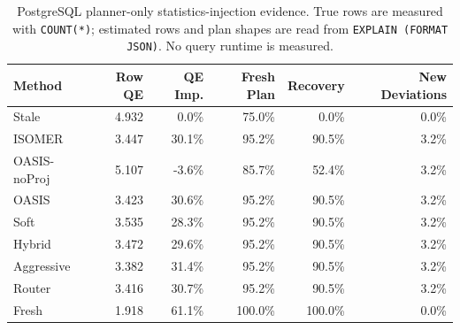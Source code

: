\begin{table}[t]
  \centering
  \small
  \caption{PostgreSQL planner-only statistics-injection evidence. True rows are measured with \texttt{COUNT(*)}; estimated rows and plan shapes are read from \texttt{EXPLAIN (FORMAT JSON)}. No query runtime is measured.}
  \label{tab:postgres_planner_stats_injection}
  \setlength{\tabcolsep}{4pt}
  \begin{tabular}{lrrrrr}
    \toprule
    Method & Row QE & QE Imp. & Fresh Plan & Recovery & New Deviations \\
    \midrule
    Stale & 4.932 & 0.0\% & 75.0\% & 0.0\% & 0.0\% \\
    ISOMER & 3.447 & 30.1\% & 95.2\% & 90.5\% & 3.2\% \\
    OASIS-noProj & 5.107 & -3.6\% & 85.7\% & 52.4\% & 3.2\% \\
    OASIS & 3.423 & 30.6\% & 95.2\% & 90.5\% & 3.2\% \\
    Soft & 3.535 & 28.3\% & 95.2\% & 90.5\% & 3.2\% \\
    Hybrid & 3.472 & 29.6\% & 95.2\% & 90.5\% & 3.2\% \\
    Aggressive & 3.382 & 31.4\% & 95.2\% & 90.5\% & 3.2\% \\
    Router & 3.416 & 30.7\% & 95.2\% & 90.5\% & 3.2\% \\
    Fresh & 1.918 & 61.1\% & 100.0\% & 100.0\% & 0.0\% \\
    \bottomrule
  \end{tabular}
\end{table}
